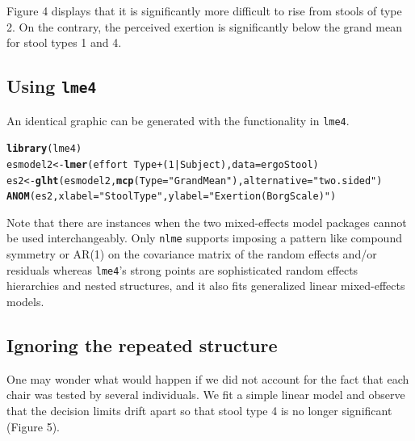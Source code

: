 \documentclass[a4paper]{article}\usepackage[]{graphicx}\usepackage[]{color}
\makeatletter
\newcommand{\hlnum}[1]{\textcolor[rgb]{0.686,0.059,0.569}{#1}}%
\newcommand{\hlstr}[1]{\textcolor[rgb]{0.192,0.494,0.8}{#1}}%
\newcommand{\hlopt}[1]{\textcolor[rgb]{0,0,0}{#1}}%
\newcommand{\hlstd}[1]{\textcolor[rgb]{0.345,0.345,0.345}{#1}}%
\newcommand{\hlkwb}[1]{\textcolor[rgb]{0.69,0.353,0.396}{#1}}%
\newcommand{\hlkwc}[1]{\textcolor[rgb]{0.333,0.667,0.333}{#1}}%
\newcommand{\hlkwd}[1]{\textcolor[rgb]{0.737,0.353,0.396}{\textbf{#1}}}%
\newenvironment{kframe}{%
 \def\at@end@of@kframe{}%
 \ifinner\ifhmode%
  \def\at@end@of@kframe{\end{minipage}}%
  \begin{minipage}{\columnwidth}%
 \fi\fi%
 \def\FrameCommand##1{\hskip\@totalleftmargin \hskip-\fboxsep
 \colorbox{shadecolor}{##1}\hskip-\fboxsep
     \hskip-\linewidth \hskip-\@totalleftmargin \hskip\columnwidth}%
 \MakeFramed {\advance\hsize-\width
   \@totalleftmargin\z@ \linewidth\hsize
   \@setminipage}}%
 {\par\unskip\endMakeFramed%
 \at@end@of@kframe}
\newenvironment{knitrout}{}{} %
\makeatother
\begin{document}
Figure 4 displays that it is significantly more difficult to rise from stools of type 2. On the contrary, the perceived exertion is significantly below the grand mean for stool types 1 and 4.

\subsection{Using \texttt{lme4}}

An identical graphic can be generated with the functionality in \texttt{lme4}.

\begin{knitrout}
\color{fgcolor}\begin{kframe}
\begin{alltt}
\hlkwd{library}\hlstd{(lme4)}
\hlstd{esmodel2} \hlkwb{<-} \hlkwd{lmer}\hlstd{(effort} \hlopt{~} \hlstd{Type} \hlopt{+} \hlstd{(}\hlnum{1}\hlopt{|}\hlstd{Subject),} \hlkwc{data}\hlstd{=ergoStool)}
\hlstd{es2} \hlkwb{<-} \hlkwd{glht}\hlstd{(esmodel2,} \hlkwd{mcp}\hlstd{(}\hlkwc{Type}\hlstd{=}\hlstr{"GrandMean"}\hlstd{),} \hlkwc{alternative}\hlstd{=}\hlstr{"two.sided"}\hlstd{)}
\hlkwd{ANOM}\hlstd{(es2,} \hlkwc{xlabel}\hlstd{=}\hlstr{"Stool Type"}\hlstd{,} \hlkwc{ylabel}\hlstd{=}\hlstr{"Exertion (Borg Scale)"}\hlstd{)}
\end{alltt}
\end{kframe}
\end{knitrout}

Note that there are instances when the two mixed-effects model packages cannot be used interchangeably. Only \texttt{nlme} supports imposing a pattern like compound symmetry or AR(1) on the covariance matrix of the random effects and/or residuals whereas \texttt{lme4}'s strong points are sophisticated random effects hierarchies and nested structures, and it also fits generalized linear mixed-effects models.

\subsection{Ignoring the repeated structure}

One may wonder what would happen if we did not account for the fact that each chair was tested by several individuals. We fit a simple linear model and observe that the decision limits drift apart so that stool type 4 is no longer significant (Figure 5).
\end{document}
